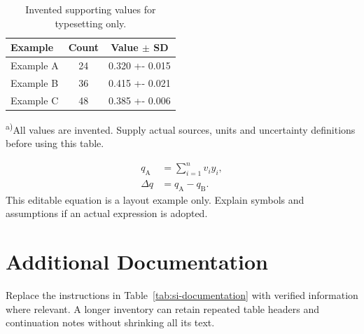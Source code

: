 \documentclass[a4paper,11pt]{article}
\begin{document}
\begin{table}[htbp]
\centering\small
\caption{Invented supporting values for typesetting only.}
\label{tab:si-values}
\begin{tabularx}{\linewidth}{@{}>{\raggedright\arraybackslash}X
 S[table-format=2.0] S[table-format=1.3(3)]@{}}
\toprule
Example & {Count} & {Value $\pm$ SD}\\
\midrule
Example A & 24 & 0.320 +- 0.015\\
Example B & 36 & 0.415 +- 0.021\\
Example C & 48 & 0.385 +- 0.006\\
\bottomrule
\end{tabularx}
\par\smallskip\footnotesize\raggedright
\textsuperscript{a)}All values are invented. Supply actual sources, units
and uncertainty definitions before using this table.
\end{table}

\begin{equation}
\begin{split}
 q_{\mathrm{A}} &= \sum_{i=1}^{n} v_i y_i,\\
 \Delta q &= q_{\mathrm{A}}-q_{\mathrm{B}}.
\end{split}\label{eq:si-example}
\end{equation}
This editable equation is a layout example only. Explain symbols and
assumptions if an actual expression is adopted.

\clearpage
\section{Additional Documentation}\label{sec:si-documentation}
Replace the instructions in Table~\ref{tab:si-documentation} with verified
information where relevant. A longer inventory can retain repeated table
headers and continuation notes without shrinking all its text.
\end{document}
